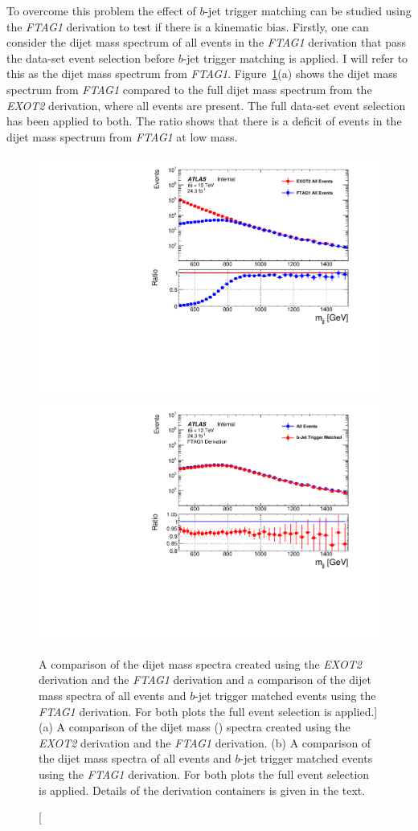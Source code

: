 To overcome this problem the effect of $b$-jet trigger matching can be studied using the \textit{FTAG1} derivation
to test if there is a kinematic bias.
Firstly, one can consider the dijet mass spectrum of all events in the \textit{FTAG1} derivation
that pass the \lm{} data-set event selection before $b$-jet trigger matching is applied.
I will refer to this as the dijet mass spectrum from \textit{FTAG1}.
Figure~\ref{fig:evt-btrig_match}(a) shows the dijet mass spectrum from \textit{FTAG1}
compared to the full dijet mass spectrum from the \textit{EXOT2} derivation, where all events are present.
The full \lm{} data-set event selection has been applied to both.
The ratio shows that there is a deficit of events in the dijet mass spectrum from \textit{FTAG1} at low mass.

\begin{figure}[!ht]
  \begin{center}
    \captionsetup[subfigure]{aboveskip=0pt,justification=centering}
    \subcaptionbox{} {\includegraphics[width=0.5\linewidth, angle=0]{figs/Dibjet/LowMass/evt-trigmatch_exot2.pdf} }\hspace{-5mm}
    \subcaptionbox{} {\includegraphics[width=0.5\linewidth, angle=0]{figs/Dibjet/LowMass/evt-trigmatch_ftag1.pdf} }
  \end{center}
  \vspace{-1em}
  \caption
      [A comparison of the dijet mass spectra created using the \textit{EXOT2} derivation and the \textit{FTAG1} derivation
       and a comparison of the dijet mass spectra of all events and $b$-jet trigger matched events using the \textit{FTAG1} derivation.
        For both plots the full \lm{} event selection is applied.]
      {(a) A comparison of the dijet mass (\mjj) spectra created using the \textit{EXOT2} derivation and the \textit{FTAG1} derivation.
        (b) A comparison of the dijet mass spectra of all events and $b$-jet trigger matched events using the \textit{FTAG1} derivation.
        For both plots the full \lm{} event selection is applied. Details of the derivation containers is given in the text. }
      \label{fig:evt-btrig_match}
      \vspace{-1em}
\end{figure}

